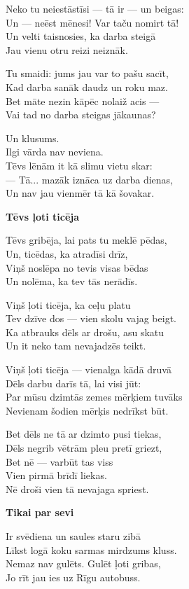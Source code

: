 \documentclass[14pt]{extarticle}
\begin{document}
{{Neko tu neiestāstīsi --- tā ir --- un beigas:\\
Un --- neēst mēnesi! Var taču nomirt tā!\\
Un velti taisnosies, ka darba steigā\\
Jau vienu otru reizi neiznāk. 

Tu smaidi: jums jau var to pašu sacīt,\\
Kad darba sanāk daudz un roku maz.\\
Bet māte nezin kāpēc nolaiž acis ---\\
Vai tad no darba steigas jākaunas?

Un klusums.\\
Ilgi vārda nav neviena.\\
Tēvs lēnām it kā slimu vietu skar:\\
--- Tā... mazāk iznāca uz darba dienas,\\
Un nav jau vienmēr tā kā šovakar. 


{\bf Tēvs ļoti ticēja}

Tēvs gribēja, lai pats tu meklē pēdas,\\
Un, ticēdas, ka atradīsi drīz,\\
Viņš noslēpa no tevis visas bēdas\\
Un nolēma, ka tev tās nerādīs.

Viņš ļoti ticēja, ka ceļu platu\\
Tev dzīve dos --- vien skolu vajag beigt.\\
Ka atbrauks dēls ar drošu, asu skatu\\
Un it neko tam nevajadzēs teikt. 

Viņš ļoti ticēja --- vienalga kādā druvā\\
Dēls darbu darīs tā, lai visi jūt:\\
Par mūsu dzimtās zemes mērķiem tuvāks\\
Nevienam šodien mērķis nedrīkst būt.

Bet dēls ne tā ar dzimto pusi tiekas, \\
Dēls negrib vētrām pleu pretī griezt,\\
Bet nē --- varbūt tas viss\\
Vien pirmā brīdī liekas.\\
Nē droši vien tā nevajaga spriest. 


{\bf Tikai par sevi}

Ir svēdiena un saules staru zibā\\
Līkst logā koku sarmas mirdzums kluss.\\
Nemaz nav gulēts. Gulēt ļoti gribas,\\
Jo rīt jau ies uz Rīgu autobuss. 

}}
\end{document}
